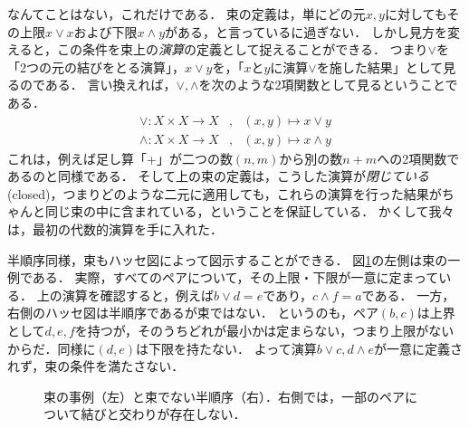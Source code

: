 \documentclass[11pt,a4paper, dvipdfmx]{jsarticle}
\begin{document}
なんてことはない，これだけである．
束の定義は，単にどの元$x, y$に対してもその上限$x \vee x$および下限$x \wedge y$がある，と言っているに過ぎない．
しかし見方を変えると，この条件を束上の\emph{演算}の定義として捉えることができる．
つまり$\vee$を「2つの元の結びをとる演算」，$x \vee y$を，「$x$と$y$に演算$\vee$を施した結果」として見るのである．
言い換えれば，$\vee, \wedge$を次のような2項関数として見るということである．
\begin{align*}
 \vee: X \times X \to X &, \ \ \ (x, y) \mapsto x \vee y \\
 \wedge: X \times X \to X &, \ \ \ (x, y) \mapsto x \wedge y 
\end{align*}
これは，例えば足し算「+」が二つの数$(n, m)$から別の数$n + m$への2項関数であるのと同様である．
そして上の束の定義は，こうした演算が\emph{閉じている}(closed)，つまりどのような二元に適用しても，これらの演算を行った結果がちゃんと同じ束の中に含まれている，ということを保証している．
かくして我々は，最初の代数的演算を手に入れた．

半順序同様，束もハッセ図によって図示することができる．
図\ref{fig:lattice}の左側は束の一例である．
実際，すべてのペアについて，その上限・下限が一意に定まっている．
上の演算を確認すると，例えば$b\vee d = e$であり，$c \wedge f = a$である．
一方，右側のハッセ図は半順序であるが束ではない．
というのも，ペア$(b, c)$は上界として$d, e, f$を持つが，そのうちどれが最小かは定まらない，つまり上限がないからだ．同様に$(d, e)$は下限を持たない．
よって演算$b \vee c, d \wedge e$が一意に定義されず，束の条件を満たさない．
\begin{figure}[h]
    \centering
    \caption{束の事例（左）と束でない半順序（右）．右側では，一部のペアについて結びと交わりが存在しない．}
    \label{fig:lattice}
\end{figure}
\end{document}
